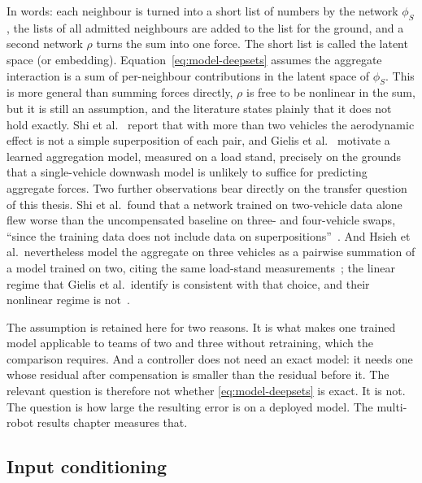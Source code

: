 In words: each neighbour is turned into a short list of numbers by the network $\phi_S$, the lists of
all admitted neighbours are added to the list for the ground, and a second network $\rho$ turns the sum
into one force. The short list is called the latent space (or embedding). Equation~\eqref{eq:model-deepsets}
assumes the aggregate interaction is a sum of per-neighbour contributions in the latent space of
$\phi_S$. This is more general than summing forces directly,
$\rho$ is free to be nonlinear in the sum, but it is still an assumption, and the literature
states plainly that it does not hold exactly. Shi et al.~\cite{shi2020neuralswarm} report that with
more than two vehicles the aerodynamic effect is not a simple superposition of each pair, and Gielis
et al.~\cite{gielis2023aggregate} motivate a learned aggregation model, measured on a load stand,
precisely on the grounds that a single-vehicle downwash model is unlikely to suffice for predicting
aggregate forces.
Two further observations bear directly on the transfer question of this thesis. Shi et al.\ found
that a network trained on two-vehicle data alone flew worse than the uncompensated baseline on
three- and four-vehicle swaps, ``since the training data does not include data on
superpositions''~\cite{shi2020neuralswarm}. And Hsieh et al.\ nevertheless model the aggregate on
three vehicles as a pairwise summation of a model trained on two, citing the same load-stand
measurements~\cite{hsieh2025onlineadaptation}; the linear regime that Gielis et al.\ identify is
consistent with that choice, and their nonlinear regime is not~\cite{gielis2023aggregate}.

The assumption is retained here for two reasons. It is what makes one trained model applicable to
teams of two and three without retraining, which the comparison requires. And a controller does not
need an exact model: it needs one whose residual after compensation is smaller than the residual
before it. The relevant question is therefore not whether \eqref{eq:model-deepsets} is exact. It is not.
The question is how large the resulting error is on a deployed model. The multi-robot results
chapter measures that.

\subsection{Input conditioning}
\label{sec:model-guards}

